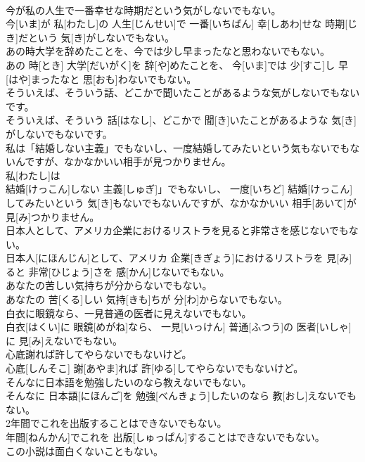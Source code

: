 \documentclass[8pt]{extreport}
\begin{document}
\begin{CJK}{UTF8}{min}
\\	今が私の人生で一番幸せな時期だという気がしないでもない。	
\\	今[いま]が 私[わたし]の 人生[じんせい]で 一番[いちばん] 幸[しあわ]せな 時期[じき]だという 気[き]がしないでもない。
\\	あの時大学を辞めたことを、今では少し早まったなと思わないでもない。	
\\	あの 時[とき] 大学[だいがく]を 辞[や]めたことを、 今[いま]では 少[すこ]し 早[はや]まったなと 思[おも]わないでもない。
\\	そういえば、そういう話、どこかで聞いたことがあるような気がしないでもないです。	
\\	そういえば、そういう 話[はなし]、どこかで 聞[き]いたことがあるような 気[き]がしないでもないです。
\\	私は「結婚しない主義」でもないし、一度結婚してみたいという気もないでもないんですが、なかなかいい相手が見つかりません。	
\\	私[わたし]は
\\	結婚[けっこん]しない 主義[しゅぎ]」でもないし、 一度[いちど] 結婚[けっこん]してみたいという 気[き]もないでもないんですが、なかなかいい 相手[あいて]が 見[み]つかりません。
\\	日本人として、アメリカ企業におけるリストラを見ると非常さを感じないでもない。	
\\	日本人[にほんじん]として、アメリカ 企業[きぎょう]におけるリストラを 見[み]ると 非常[ひじょう]さを 感[かん]じないでもない。
\\	あなたの苦しい気持ちが分からないでもない。	
\\	あなたの 苦[くる]しい 気持[きも]ちが 分[わ]からないでもない。
\\	白衣に眼鏡なら、一見普通の医者に見えないでもない。	
\\	白衣[はくい]に 眼鏡[めがね]なら、 一見[いっけん] 普通[ふつう]の 医者[いしゃ]に 見[み]えないでもない。
\\	心底謝れば許してやらないでもないけど。	
\\	心底[しんそこ] 謝[あやま]れば 許[ゆる]してやらないでもないけど。
\\	そんなに日本語を勉強したいのなら教えないでもない。	
\\	そんなに 日本語[にほんご]を 勉強[べんきょう]したいのなら 教[おし]えないでもない。
\\	2年間でこれを出版することはできないでもない。	
\\	年間[ねんかん]でこれを 出版[しゅっぱん]することはできないでもない。
\\	この小説は面白くないこともない。	

\end{CJK}
\end{document}
